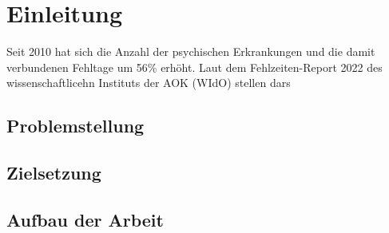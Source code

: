 \section{Einleitung}
Seit 2010 hat sich die Anzahl der psychischen Erkrankungen und die damit verbundenen Fehltage um 56\% erhöht. Laut dem Fehlzeiten-Report 2022 des wissenschaftlicehn Instituts der AOK (WIdO) stellen dars
\subsection{Problemstellung}
\subsection{Zielsetzung}
\subsection{Aufbau der Arbeit}

